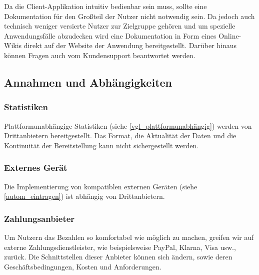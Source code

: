 Da die Client-Applikation intuitiv bedienbar sein muss, sollte eine Dokumentation für den Großteil der Nutzer
nicht notwendig sein.
Da jedoch auch technisch weniger versierte Nutzer zur Zielgruppe gehören
und um spezielle Anwendungsfälle abzudecken wird eine Dokumentation
in Form eines Online-Wikis direkt auf der Website der Anwendung bereitgestellt.
Darüber hinaus können Fragen auch vom Kundensupport beantwortet werden.

\subsection{Annahmen und Abhängigkeiten}


\subsubsection{Statistiken}
Plattformunabhängige Statistiken (siehe \ref{vgl_plattformunabhängig}) werden von Drittanbietern bereitgestellt.
Das Format, die Aktualität der Daten und die Kontinuität der Bereitstellung kann nicht sichergestellt werden.


\subsubsection{Externes Gerät}
Die Implementierung von kompatiblen externen Geräten (siehe \ref{autom_eintragen}) ist abhängig von Drittanbietern.

\subsubsection{Zahlungsanbieter}

Um Nutzern das Bezahlen so komfortabel wie möglich zu machen, greifen wir auf externe Zahlungsdienstleister,
wie beispielsweise PayPal, Klarna, Visa usw., zurück.
Die Schnittstellen dieser Anbieter können sich ändern, sowie deren Geschäftsbedingungen, Kosten und Anforderungen.
